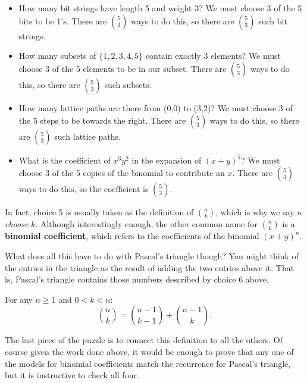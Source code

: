 \documentclass[10pt,]{book}
\newcommand{\terminology}[1]{\textbf{#1}}
\theoremstyle{plain}
\theoremstyle{definition}
\theoremstyle{definition}
\theoremstyle{definition}
\numberwithin{equation}{chapter}
\newcommand{\lt}{<}
\begin{document}
\begin{itemize}[label=\textbullet]
\item{}\hypertarget{p-75}{}%
How many bit strings have length 5 and weight 3?  We must choose \(3\) of the 5 bits to be 1's.  There are \({5 \choose 3}\) ways to do this, so there are \({5 \choose 3}\) such bit strings.%
\item{}\hypertarget{p-76}{}%
How many subsets of \(\{1,2,3,4,5\}\) contain exactly 3 elements?  We must choose \(3\) of the 5 elements to be in our subset.  There are \({5 \choose 3}\) ways to do this, so there are \({5 \choose 3}\) such subsets.%
\item{}\hypertarget{p-77}{}%
How many lattice paths are there from (0,0) to (3,2)?  We must choose 3 of the 5 steps to be towards the right.  There are \({5 \choose 3}\) ways to do this, so there are \({5 \choose 3}\) such lattice paths.%
\item{}\hypertarget{p-78}{}%
What is the coefficient of \(x^3y^2\) in the expansion of \((x+y)^5\)?  We must choose 3 of the 5 copies of the binomial to contribute an \(x\).  There are \({5 \choose 3}\) ways to do this, so the coefficient is \({5 \choose 3}\).%
\end{itemize}
%
\par
\hypertarget{p-79}{}%
In fact, choice 5 is usually taken as the definition of \(\binom{n}{k}\), which is why we say \(n\) \emph{choose} \(k\).  Although interestingly enough, the other common name for \(\binom{n}{k}\) is a \terminology{binomial coefficient}, which refers to the coefficients of the binomial \((x+y)^n\).%
\par
\hypertarget{p-80}{}%
What does all this have to do with Pascal's triangle though?  You might think of the entries in the triangle as the result of adding the two entries above it.  That is, Pascal's triangle contains those numbers described by choice 6 above.%
\begin{assemblage}\label{assemblage-2}
\hypertarget{p-81}{}%
For any \(n \ge 1\) and \(0 \lt k \lt n\):%
\begin{equation*}
{n \choose k} = {n-1 \choose k-1} + {n-1 \choose k}.
\end{equation*}
%
\end{assemblage}
\hypertarget{p-82}{}%
The last piece of the puzzle is to connect this definition to all the others.  Of course given the work done above, it would be enough to prove that any one of the models for binomial coefficients match the recurrence for Pascal's triangle, but it is instructive to check all four.%
\end{document}
